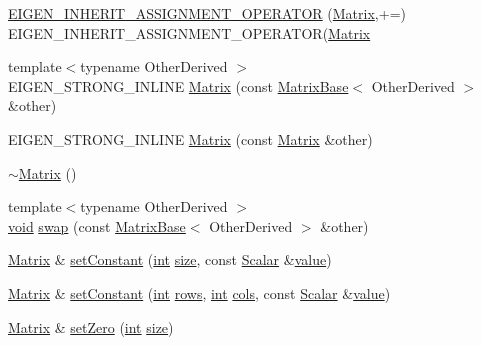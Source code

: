 \begin{DoxyCompactItemize}
\hyperlink{class_matrix_acd996ee8b6418514a2673b15746385bb}{E\-I\-G\-E\-N\-\_\-\-I\-N\-H\-E\-R\-I\-T\-\_\-\-A\-S\-S\-I\-G\-N\-M\-E\-N\-T\-\_\-\-O\-P\-E\-R\-A\-T\-O\-R} (\hyperlink{class_matrix}{Matrix},+=) E\-I\-G\-E\-N\-\_\-\-I\-N\-H\-E\-R\-I\-T\-\_\-\-A\-S\-S\-I\-G\-N\-M\-E\-N\-T\-\_\-\-O\-P\-E\-R\-A\-T\-O\-R(\hyperlink{class_matrix}{Matrix}
\item 
{\footnotesize template$<$typename Other\-Derived $>$ }\\E\-I\-G\-E\-N\-\_\-\-S\-T\-R\-O\-N\-G\-\_\-\-I\-N\-L\-I\-N\-E \hyperlink{class_matrix_adb1d3bb44fa8d31381d050a247a3d2e5}{Matrix} (const \hyperlink{class_matrix_base}{Matrix\-Base}$<$ Other\-Derived $>$ \&other)
\item 
E\-I\-G\-E\-N\-\_\-\-S\-T\-R\-O\-N\-G\-\_\-\-I\-N\-L\-I\-N\-E \hyperlink{class_matrix_a8ca849913ba36f5c0ba764ac63cc7888}{Matrix} (const \hyperlink{class_matrix}{Matrix} \&other)
\item 
\hyperlink{class_matrix_adc095fc58e400a1991a77634099590ca}{$\sim$\-Matrix} ()
\item 
{\footnotesize template$<$typename Other\-Derived $>$ }\\\hyperlink{group___u_a_v_objects_plugin_ga444cf2ff3f0ecbe028adce838d373f5c}{void} \hyperlink{class_matrix_a9ba8fe849bd1b8628bb57f7969db5afd}{swap} (const \hyperlink{class_matrix_base}{Matrix\-Base}$<$ Other\-Derived $>$ \&other)
\item 
\hyperlink{class_matrix}{Matrix} \& \hyperlink{class_matrix_aae4dcbebd18b6adcdd388001bbf65d50}{set\-Constant} (\hyperlink{ioapi_8h_a787fa3cf048117ba7123753c1e74fcd6}{int} \hyperlink{glext_8h_a014d89bd76f74ef3a29c8f04b473eb76}{size}, const \hyperlink{class_matrix_base_a625df8339dc2d816cbc0fd66e7dadaf5}{Scalar} \&\hyperlink{glext_8h_aa0e2e9cea7f208d28acda0480144beb0}{value})
\item 
\hyperlink{class_matrix}{Matrix} \& \hyperlink{class_matrix_a63a6e27117a5c7facb0e53802c0bc78e}{set\-Constant} (\hyperlink{ioapi_8h_a787fa3cf048117ba7123753c1e74fcd6}{int} \hyperlink{class_matrix_a5c0643ac5b12c576300a3c60899a61c9}{rows}, \hyperlink{ioapi_8h_a787fa3cf048117ba7123753c1e74fcd6}{int} \hyperlink{class_matrix_a6457e87782c95b003d23f8b8b90e6838}{cols}, const \hyperlink{class_matrix_base_a625df8339dc2d816cbc0fd66e7dadaf5}{Scalar} \&\hyperlink{glext_8h_aa0e2e9cea7f208d28acda0480144beb0}{value})
\item 
\hyperlink{class_matrix}{Matrix} \& \hyperlink{class_matrix_a60ce98615f9a73a32d49ebd9413b769c}{set\-Zero} (\hyperlink{ioapi_8h_a787fa3cf048117ba7123753c1e74fcd6}{int} \hyperlink{glext_8h_a014d89bd76f74ef3a29c8f04b473eb76}{size})

\end{DoxyCompactItemize}
